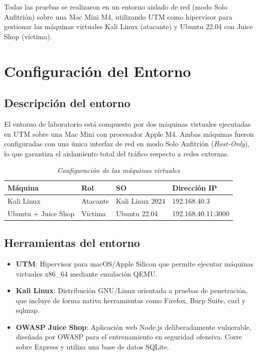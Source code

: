 \documentclass[12pt, letterpaper]{article}
\begin{document}
Todas las pruebas se realizaron en un entorno aislado de red (modo Solo Anfitrión) sobre una Mac Mini M4, utilizando UTM como hipervisor para gestionar las máquinas virtuales Kali Linux (atacante) y Ubuntu 22.04 con Juice Shop (víctima).

\section{Configuración del Entorno}

\subsection{Descripción del entorno}

El entorno de laboratorio está compuesto por dos máquinas virtuales ejecutadas en UTM sobre una Mac Mini con procesador Apple M4. Ambas máquinas fueron configuradas con una única interfaz de red en modo Solo Anfitrión (\textit{Host-Only}), lo que garantiza el aislamiento total del tráfico respecto a redes externas.

\begin{table}[H]
  \centering
  \caption{\textit{Configuración de las máquinas virtuales}}
  \begin{tabular}{@{}llll@{}}
    \toprule
    \textbf{Máquina} & \textbf{Rol} & \textbf{SO} & \textbf{Dirección IP} \\
    \midrule
    Kali Linux        & Atacante     & Kali Linux 2024 & 192.168.40.3 \\
    Ubuntu + Juice Shop & Víctima    & Ubuntu 22.04    & 192.168.40.11:3000 \\
    \bottomrule
  \end{tabular}
\end{table}

\subsection{Herramientas del entorno}

\begin{itemize}
  \item \textbf{UTM}: Hipervisor para macOS/Apple Silicon que permite ejecutar máquinas virtuales x86\_64 mediante emulación QEMU.
  \item \textbf{Kali Linux}: Distribución GNU/Linux orientada a pruebas de penetración, que incluye de forma nativa herramientas como Firefox, Burp Suite, curl y sqlmap.
  \item \textbf{OWASP Juice Shop}: Aplicación web Node.js deliberadamente vulnerable, diseñada por OWASP para el entrenamiento en seguridad ofensiva. Corre sobre Express y utiliza una base de datos SQLite.
\end{itemize}
\end{document}
